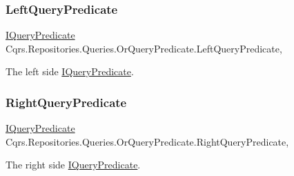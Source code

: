 \subsubsection{\texorpdfstring{Left\+Query\+Predicate}{LeftQueryPredicate}}
{\footnotesize\ttfamily \hyperlink{interfaceCqrs_1_1Repositories_1_1Queries_1_1IQueryPredicate}{I\+Query\+Predicate} Cqrs.\+Repositories.\+Queries.\+Or\+Query\+Predicate.\+Left\+Query\+Predicate\hspace{0.3cm}{\ttfamily [get]}, {\ttfamily [set]}}



The left side \hyperlink{interfaceCqrs_1_1Repositories_1_1Queries_1_1IQueryPredicate}{I\+Query\+Predicate}. 

\mbox{\label{classCqrs_1_1Repositories_1_1Queries_1_1OrQueryPredicate_ae1a81d19657bee8735a977b247fef4d0_ae1a81d19657bee8735a977b247fef4d0}} 
\subsubsection{\texorpdfstring{Right\+Query\+Predicate}{RightQueryPredicate}}
{\footnotesize\ttfamily \hyperlink{interfaceCqrs_1_1Repositories_1_1Queries_1_1IQueryPredicate}{I\+Query\+Predicate} Cqrs.\+Repositories.\+Queries.\+Or\+Query\+Predicate.\+Right\+Query\+Predicate\hspace{0.3cm}{\ttfamily [get]}, {\ttfamily [set]}}



The right side \hyperlink{interfaceCqrs_1_1Repositories_1_1Queries_1_1IQueryPredicate}{I\+Query\+Predicate}. 

